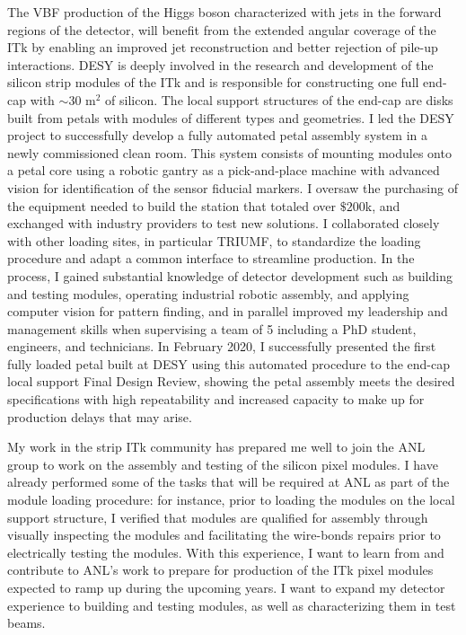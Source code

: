 \documentclass[a4paper]{article}
\begin{document}
The VBF production of the Higgs boson  characterized with jets in the forward regions of the detector, will benefit from the extended angular coverage of the ITk by enabling an improved jet reconstruction and better rejection of pile-up interactions.
DESY is deeply involved in the research and development of the silicon strip modules of the ITk and is responsible for constructing one full end-cap
with $\sim 30$ m$^2$ of silicon. The local support structures of the end-cap are disks built from petals with modules of different types and geometries.
I led the DESY project to successfully develop a fully automated petal assembly system in a newly commissioned clean room.
This system consists of mounting modules onto a petal core using a robotic gantry as a pick-and-place machine with advanced vision for identification of the sensor fiducial markers. I oversaw the purchasing of the equipment needed to build the station that totaled over $\$200$k, and exchanged with industry providers to test new solutions. I collaborated closely with other loading sites, in particular TRIUMF, to standardize the loading procedure and adapt a common interface to streamline production.
In the process, I gained substantial knowledge of detector development such as building and testing modules, operating industrial robotic assembly, and applying computer vision for pattern finding, and in parallel improved my leadership and management skills when supervising a team of 5 including a PhD student, engineers, and technicians. In February 2020, I successfully presented the first fully loaded petal built at DESY using this automated procedure to the end-cap local support Final Design Review, showing the petal assembly meets the desired specifications with high repeatability and increased capacity to make up for production delays that may arise.

My work in the strip ITk community has prepared me well to join the ANL group to work on the assembly and testing of the silicon pixel modules.
I have already performed some of the tasks that will be required at ANL as part of the module loading procedure: for instance, prior to loading the modules on the local support structure, I verified that modules are qualified for assembly through visually inspecting the modules and
facilitating the wire-bonds repairs prior to electrically testing the modules.
With this experience, I want to learn from and contribute to ANL's work to prepare for production of the ITk pixel modules expected to ramp up during the upcoming years. I want to expand my detector experience to building and testing modules, as well as characterizing them in test beams.
\end{document}
